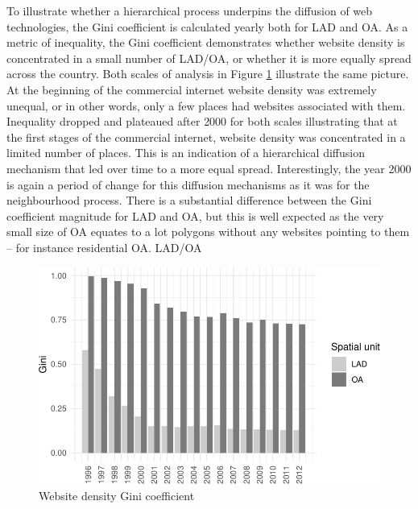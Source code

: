 \documentclass[
  authoryear,
  preprint,
  3p]{elsarticle}
\begin{document}
To illustrate whether a hierarchical process underpins the diffusion of
web technologies, the Gini coefficient is calculated yearly both for LAD
and OA. As a metric of inequality, the Gini coefficient demonstrates
whether website density is concentrated in a small number of LAD/OA, or
whether it is more equally spread across the country. Both scales of
analysis in Figure \ref{gini} illustrate the same picture. At the
beginning of the commercial internet website density was extremely
unequal, or in other words, only a few places had websites associated
with them. Inequality dropped and plateaued after 2000 for both scales
illustrating that at the first stages of the commercial internet,
website density was concentrated in a limited number of places. This is
an indication of a hierarchical diffusion mechanism that led over time
to a more equal spread. Interestingly, the year 2000 is again a period
of change for this diffusion mechanisms as it was for the neighbourhood
process. There is a substantial difference between the Gini coefficient
magnitude for LAD and OA, but this is well expected as the very small
size of OA equates to a lot polygons without any websites pointing to
them -- for instance residential OA. LAD/OA

\begin{figure}[H]

{\centering \includegraphics[width=1\textwidth,height=\textheight]{tranos2023_files/figure-pdf/gini-1.pdf}

}

\caption{\label{gini}Website density Gini coefficient}

\end{figure}%
\end{document}
